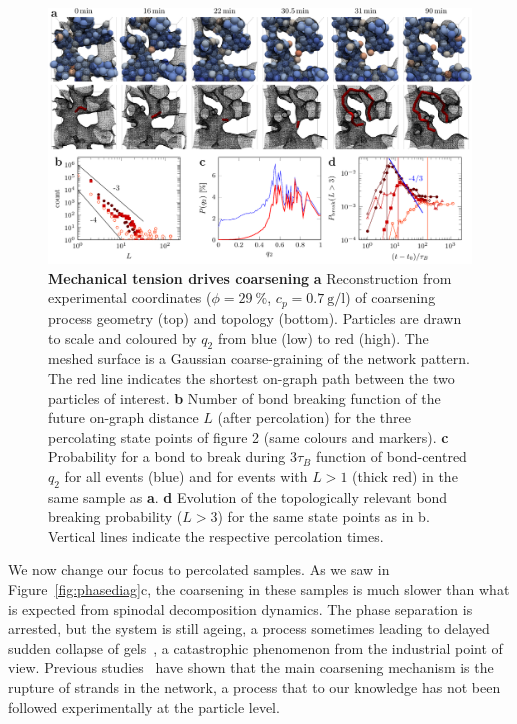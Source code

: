 \begin{figure}
\includegraphics{figs/breaking.pdf}
\caption{\textbf{Mechanical tension drives coarsening} 
\textbf{a} Reconstruction from experimental coordinates ($\phi=29~\%$, $c_p=\SI{0.7}{\gram\per\litre}$) of coarsening process geometry (top) and topology (bottom). Particles are drawn to scale and coloured by $q_2$ from blue (low) to red (high). The meshed surface is a Gaussian coarse-graining of the network pattern. The red line indicates the shortest on-graph path between the two particles of interest. 
\textbf{b} Number of bond breaking function of the future on-graph distance $L$ (after percolation) for the three percolating state points of figure 2 (same colours and markers).
\textbf{c} Probability for a bond to break during $3\tau_B$ function of bond-centred $q_2$ for all events (blue) and for events with $L>1$ (thick red) in the same sample as \textbf{a}.
\textbf{d} Evolution of the topologically relevant bond breaking probability ($L>3$) for the same state points  as in b. Vertical lines indicate the respective percolation times.
}
\label{fig:breaking}
\end{figure}

We now change our focus to percolated samples. As we saw in Figure~\ref{fig:phasediag}c, the coarsening in these samples is much slower than what is expected from spinodal decomposition dynamics. The phase separation is arrested, but the system is still ageing, a process sometimes leading to delayed sudden collapse of gels~\cite{Teece2011,Bartlett2012}, a catastrophic phenomenon from the industrial point of view. Previous studies~\cite{Tanaka2007,Bartlett2012} have shown that the main coarsening mechanism is the rupture of strands in the network, a process that to our knowledge has not been followed experimentally at the particle level.

